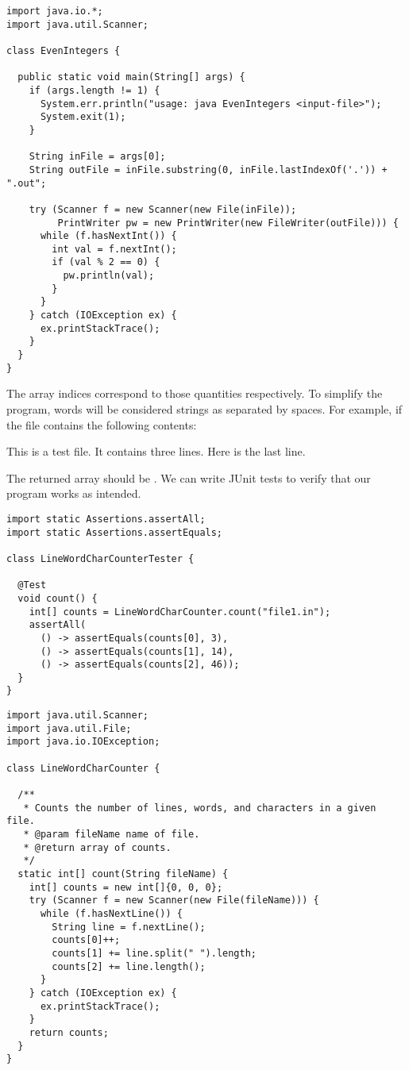 \enlargethispage{-1\baselineskip}
\begin{lstlisting}[language=MyJava]
import java.io.*;
import java.util.Scanner;

class EvenIntegers {

  public static void main(String[] args) {
    if (args.length != 1) {
      System.err.println("usage: java EvenIntegers <input-file>");
      System.exit(1);
    }

    String inFile = args[0];
    String outFile = inFile.substring(0, inFile.lastIndexOf('.')) + ".out";

    try (Scanner f = new Scanner(new File(inFile));
         PrintWriter pw = new PrintWriter(new FileWriter(outFile))) {
      while (f.hasNextInt()) {
        int val = f.nextInt();
        if (val % 2 == 0) { 
          pw.println(val); 
        }
      }
    } catch (IOException ex) { 
      ex.printStackTrace(); 
    }
  }
}
\end{lstlisting}

The array indices correspond to those quantities respectively. 
To simplify the program, words will be considered strings as separated by spaces. 
For example, if the file contains the following contents:

\begin{verbnobox}[\small]
This is a test file.
It contains three lines.
Here is the last line.
\end{verbnobox}

The returned array should be \ttt{[3, 14, 46]}. 
We can write JUnit tests to verify that our program works as intended.

\begin{lstlisting}[language=MyJava]
import static Assertions.assertAll;
import static Assertions.assertEquals;

class LineWordCharCounterTester {

  @Test
  void count() {
    int[] counts = LineWordCharCounter.count("file1.in");
    assertAll(
      () -> assertEquals(counts[0], 3),
      () -> assertEquals(counts[1], 14),
      () -> assertEquals(counts[2], 46));
  }
}
\end{lstlisting}

\begin{lstlisting}[language=MyJava]
import java.util.Scanner;
import java.util.File;
import java.io.IOException;

class LineWordCharCounter {

  /**
   * Counts the number of lines, words, and characters in a given file.
   * @param fileName name of file.
   * @return array of counts.
   */
  static int[] count(String fileName) {
    int[] counts = new int[]{0, 0, 0};
    try (Scanner f = new Scanner(new File(fileName))) {
      while (f.hasNextLine()) {
        String line = f.nextLine();
        counts[0]++;
        counts[1] += line.split(" ").length;
        counts[2] += line.length();
      }
    } catch (IOException ex) { 
      ex.printStackTrace(); 
    }
    return counts;
  }
}
\end{lstlisting}

